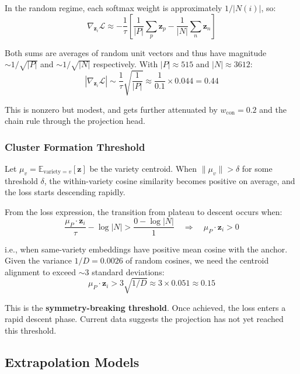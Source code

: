\documentclass[11pt,a4paper]{article}
\newcommand{\loss}{\mathcal{L}}
\newcommand{\expect}{\mathbb{E}}
\begin{document}
In the random regime, each softmax weight is approximately $1/|N(i)|$, so:
\begin{equation}
\nabla_{\mathbf{z}_i} \loss \approx -\frac{1}{\tau} \left[
    \frac{1}{|P|}\sum_p \mathbf{z}_p - \frac{1}{|N|}\sum_n \mathbf{z}_n
\right]
\end{equation}

Both sums are averages of random unit vectors and thus have magnitude $\sim 1/\sqrt{|P|}$
and $\sim 1/\sqrt{|N|}$ respectively. With $|P| \approx 515$ and $|N| \approx 3612$:
\begin{equation}
|\nabla_{\mathbf{z}_i} \loss| \sim \frac{1}{\tau}\sqrt{\frac{1}{|P|}} \approx \frac{1}{0.1} \times 0.044 = 0.44
\end{equation}

This is nonzero but modest, and gets further attenuated by $w_{\text{con}} = 0.2$
and the chain rule through the projection head.

\subsubsection{Cluster Formation Threshold}

Let $\mu_v = \expect_{\text{variety}=v}[\mathbf{z}]$ be the variety centroid. When
$\|\mu_v\| > \delta$ for some threshold $\delta$, the within-variety cosine similarity
becomes positive on average, and the loss starts descending rapidly.

From the loss expression, the transition from plateau to descent occurs when:
\begin{equation}
\frac{\mu_P \cdot \mathbf{z}_i}{\tau} - \log|N| > \frac{0 - \log|N|}{1} \quad\Rightarrow\quad
\mu_P \cdot \mathbf{z}_i > 0
\end{equation}

i.e., when same-variety embeddings have positive mean cosine with the anchor. Given
the variance $1/D = 0.0026$ of random cosines, we need the centroid alignment to
exceed $\sim$3 standard deviations:
\begin{equation}
\mu_P \cdot \mathbf{z}_i > 3\sqrt{1/D} \approx 3 \times 0.051 \approx 0.15
\end{equation}

This is the \textbf{symmetry-breaking threshold}. Once achieved, the loss enters a
rapid descent phase. Current data suggests the projection has not yet reached this
threshold.


\subsection{Extrapolation Models}
\end{document}

